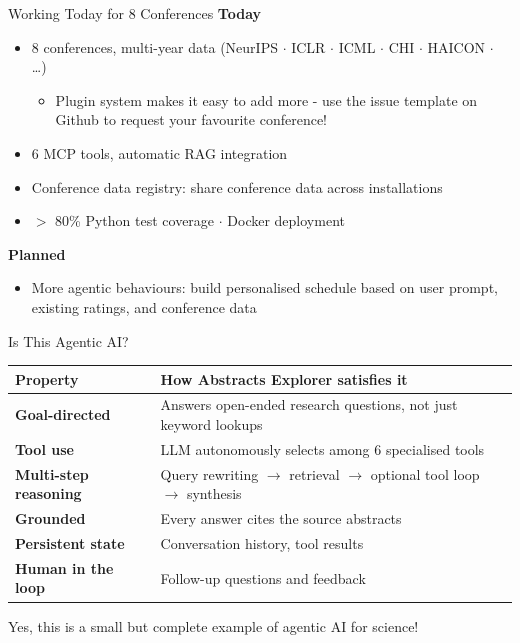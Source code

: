 \documentclass[
  aspectratio=1610,
]{beamer}
\begin{document}
\begin{frame}{Working Today for 8 Conferences}
  \large
  \textbf{Today}
  \begin{itemize}
    \item 8 conferences, multi-year data (NeurIPS $\cdot$ ICLR $\cdot$ ICML $\cdot$ CHI $\cdot$ HAICON $\cdot$ \ldots)
          \begin{itemize}
            \item Plugin system makes it easy to add more - use the issue template on Github to request your favourite conference!
          \end{itemize}
    \item 6 MCP tools, automatic RAG integration
    \item Conference data registry: share conference data across installations
    \item $>$ 80\% Python test coverage $\cdot$ Docker deployment
  \end{itemize}
  \vspace{0.5em}
  \textbf{Planned}
  \begin{itemize}
    \item More agentic behaviours: build personalised schedule based on user prompt, existing ratings, and conference data
  \end{itemize}
\end{frame}

\begin{frame}{Is This Agentic AI?}
  \large
  \begin{tabularx}{\textwidth}{lX}
    \toprule
    \textbf{Property}             & \textbf{How Abstracts Explorer satisfies it}                                                     \\
    \midrule
    \textbf{Goal-directed}        & Answers open-ended research questions, not just keyword lookups                                  \\
    \textbf{Tool use}             & LLM autonomously selects among 6 specialised tools                                               \\
    \textbf{Multi-step reasoning} & Query rewriting $\rightarrow$ retrieval $\rightarrow$ optional tool loop $\rightarrow$ synthesis \\
    \textbf{Grounded}             & Every answer cites the source abstracts                                                          \\
    \textbf{Persistent state}     & Conversation history, tool results                                                               \\
    \textbf{Human in the loop}    & Follow-up questions and feedback                                                                 \\
    \bottomrule
  \end{tabularx}

  \vspace{1em}
  Yes, this is a small but complete example of agentic AI for science!
\end{frame}
\end{document}
